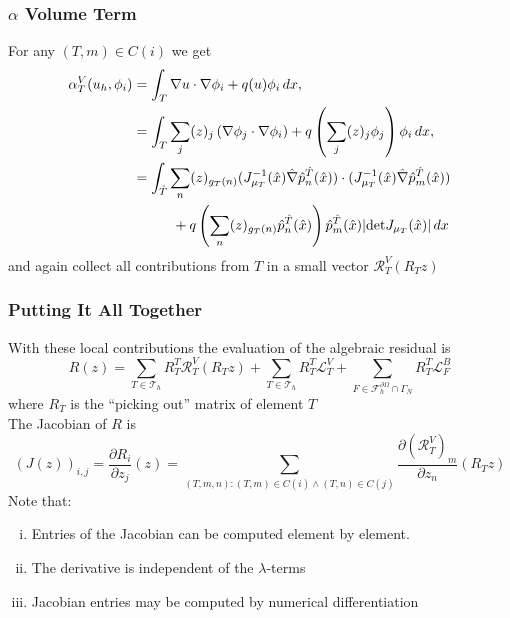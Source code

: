 \documentclass[aspectratio=169,11pt]{beamer}
\theoremstyle{definition}
\begin{document}
\begin{frame}
\frametitle{$\alpha$ Volume Term}
For any $(T,m)\in C(i)$ we get
\begin{equation*}
\begin{split}
\alpha_T^V(u_h,\phi_i) &= \int_T \nabla u \cdot \nabla \phi_i + q(u) \phi_i \,dx, \\
&= \int_T \sum_j (z)_j \left(\nabla \phi_j \cdot \nabla \phi_i \right)
+ q\left( \sum_j (z)_j \phi_j \right) \phi_i \,dx,\\
&= \int_{\hat T} \sum_{n} (z)_{g_T(n)} (J_{\mu_T}^{-1}(\hat x) \hat\nabla \hat p_n^{\hat T}(\hat x) )
\cdot (J_{\mu_T}^{-1}(\hat x) \hat\nabla \hat p_m^{\hat T}(\hat x) ) \\
&\hspace{10mm}+ q\left( \sum_n (z)_{g_T(n)} \hat p_n^{\hat T}(\hat x) \right) \hat p_m^{\hat T}(\hat x)
|\text{det} J_{\mu_T}(\hat x)| \,dx
\end{split}
\end{equation*}
and again collect all contributions from $T$ in a small vector $\mathcal{R}_T^V(R_T z)$
\end{frame}

\begin{frame}
\frametitle{Putting It All Together}
With these local contributions the evaluation of the algebraic residual is
\begin{equation*}
R(z) =
\sum_{T\in\mathcal{T}_h} R_T^T \mathcal{R}_T^V(R_T z)
  + \sum_{T\in\mathcal{T}_h} R_T^T \mathcal{L}_T^V
 + \sum_{F\in\mathcal{F}_h^{\partial\Omega}\cap\Gamma_N} R_T^T \mathcal{L}_F^B
\end{equation*}
where $R_T$ is the ``picking out'' matrix of element $T$\\
\medskip
The Jacobian of $R$ is
\begin{equation*}
(J(z))_{i,j} = \frac{\partial R_i}{\partial z_j} (z) =
\sum_{(T,m,n) : (T,m)\in C(i) \wedge (T,n)\in C(j)} \frac{\partial (\mathcal{R}_T^V)_m}{\partial z_n}
(R_T z)
\end{equation*}
Note that:
\begin{enumerate}[i)]
\item Entries of the Jacobian can be computed element by element.
\item The derivative is independent of the $\lambda$-terms
\item Jacobian entries may be computed by numerical differentiation
\end{enumerate}
\end{frame}
\end{document}
